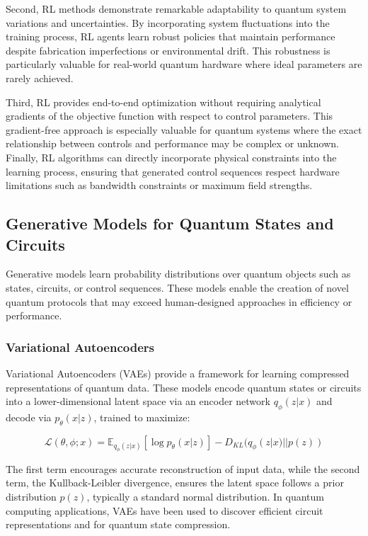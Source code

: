 Second, RL methods demonstrate remarkable adaptability to quantum system variations and uncertainties. By incorporating system fluctuations into the training process, RL agents learn robust policies that maintain performance despite fabrication imperfections or environmental drift. This robustness is particularly valuable for real-world quantum hardware where ideal parameters are rarely achieved.

Third, RL provides end-to-end optimization without requiring analytical gradients of the objective function with respect to control parameters. This gradient-free approach is especially valuable for quantum systems where the exact relationship between controls and performance may be complex or unknown. Finally, RL algorithms can directly incorporate physical constraints into the learning process, ensuring that generated control sequences respect hardware limitations such as bandwidth constraints or maximum field strengths.

\subsection{Generative Models for Quantum States and Circuits}

Generative models learn probability distributions over quantum objects such as states, circuits, or control sequences. These models enable the creation of novel quantum protocols that may exceed human-designed approaches in efficiency or performance.

\subsubsection{Variational Autoencoders}

Variational Autoencoders (VAEs) provide a framework for learning compressed representations of quantum data. These models encode quantum states or circuits into a lower-dimensional latent space via an encoder network $q_\phi(z|x)$ and decode via $p_\theta(x|z)$, trained to maximize:

\begin{equation}
\mathcal{L}(\theta, \phi; x) = \mathbb{E}_{q_\phi(z|x)}[\log p_\theta(x|z)] - D_{KL}(q_\phi(z|x) || p(z))
\end{equation}

The first term encourages accurate reconstruction of input data, while the second term, the Kullback-Leibler divergence, ensures the latent space follows a prior distribution $p(z)$, typically a standard normal distribution. In quantum computing applications, VAEs have been used to discover efficient circuit representations and for quantum state compression.

